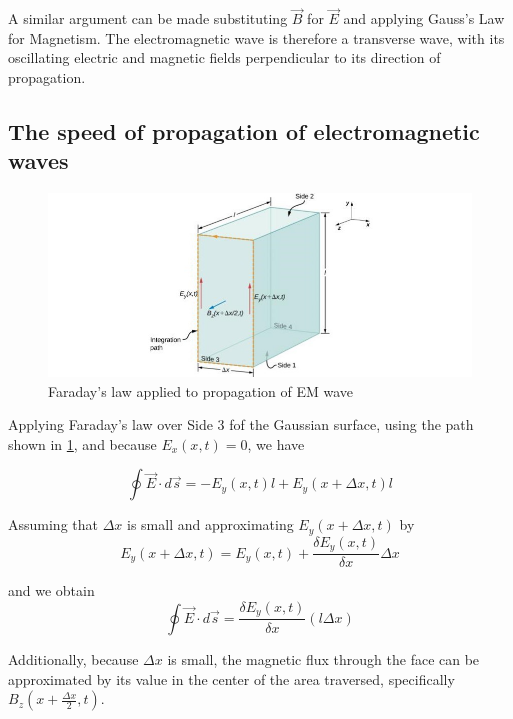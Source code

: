 \documentclass[14pt]{memoir}
\begin{document}
A similar argument can be made substituting $\vec{B}$ for $\vec{E}$ and applying Gauss's Law for Magnetism. The electromagnetic wave is therefore a transverse wave, with its oscillating electric and magnetic fields perpendicular to its direction of propagation. 

\subsection{The speed of propagation of electromagnetic waves}

\begin{figure}[H]
\begin{center}
\includegraphics[scale=0.7]{fig/fig_16_07.jpg}
\caption{Faraday's law applied to propagation of EM wave}
\label{fig:16_07}
\end{center}
\end{figure}

Applying Faraday's law over Side 3 fof the Gaussian surface, using the path shown in \ref{fig:16_07}, and because $E_x(x,t) = 0$, we have

\begin{equation}
\oint \vec{E} \cdot d \vec{s} = -E_y(x,t)l + E_y(x + \Delta x, t)l
\end{equation}

Assuming that $\Delta x$ is small and approximating  $E_y(x + \Delta x, t)$ by
\begin{equation}
E_y(x + \Delta x, t) = E_y(x, t) + \frac{\delta E_y(x, t)}{\delta x} \Delta x
\end{equation}

and we obtain
\begin{equation}
\oint \vec{E} \cdot d \vec{s} = \frac{\delta E_y(x, t)}{\delta x} (l \Delta x)
\end{equation}


Additionally, because $\Delta x$ is small, the magnetic flux through the face can be approximated by its value in the center of the area traversed, specifically $B_z(x + \frac{\Delta x}{2},t)$. 
\end{document}
